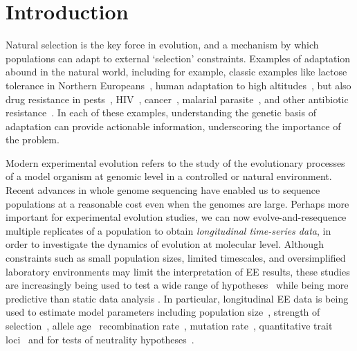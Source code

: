 \section{Introduction}
Natural selection is the key force in evolution, and a mechanism by
which populations can adapt to external `selection'
constraints. Examples of adaptation abound in the natural world,
including for example, classic examples like lactose tolerance in
Northern Europeans~\cite{bersaglieri2004genetic}, human adaptation to high
altitudes~\cite{yi2010sequencing,simonson2010genetic}, but also drug 
resistance in
pests~\cite{daborn2001ddt}, HIV~\cite{Feder2016More},
cancer~\cite{gottesman2002mechanisms,zahreddine2013mechanisms},
malarial parasite~\cite{ariey2014molecular,nair2007recurrent}, and
other antibiotic resistance~\cite{spellberg2008epidemic}. In each of
these examples, understanding the genetic basis of adaptation can
provide actionable information, underscoring the importance of the
problem.

Modern experimental evolution refers to the study of the evolutionary
processes of a model organism at genomic level in a controlled
\cite{hegreness2006equivalence,lang2013pervasive,orozco2012adaptation,
  lang2011genetic,barrick2009genome,bollback2007clonal,oz2014strength}
or natural
\cite{maldarelli2013hiv,reid2011new,denef2012situ,winters2012development,
  daniels2013genetic,barrett2008natural,bergland2014genomic}
environment. Recent advances in whole genome sequencing have enabled
us to sequence populations at a reasonable cost even when the genomes
are large. Perhaps more important for experimental evolution studies,
we can now evolve-and-resequence multiple replicates of a population to 
obtain \emph{longitudinal time-series data},
in order to investigate the dynamics of evolution at molecular level.
Although constraints such
as small population sizes, limited timescales, and oversimplified
laboratory environments may limit the interpretation of EE results, these
studies are increasingly being used to test a wide range of 
hypotheses~\cite{kawecki2012experimental} while being more predictive than 
static data analysis
\cite{boyko2008assessing,desai2008polymorphism,sawyer1992population}. 
In particular, longitudinal EE data is being used to estimate model parameters 
including
population
size~\cite{williamson1999using,wang2001pseudo,pollak1983new,waples1989generalized,
  Terhorst2015Multi}, strength of
selection~\cite{mathieson2013estimating,illingworth2011distinguishing,Terhorst2015Multi,
  bollback2008estimation,illingworth2012quantifying,malaspinas2012estimating,
  Steinrücken2014a}, allele age~\cite{malaspinas2012estimating}
recombination rate~\cite{Terhorst2015Multi}, mutation
rate~\cite{Barrick2013Genome, Terhorst2015Multi}, quantitative trait
loci~\cite{baldwin2014power} and for tests of neutrality
hypotheses~\cite{feder2014Identifying,Terhorst2015Multi,burke2010genome,bergland2014genomic}.

